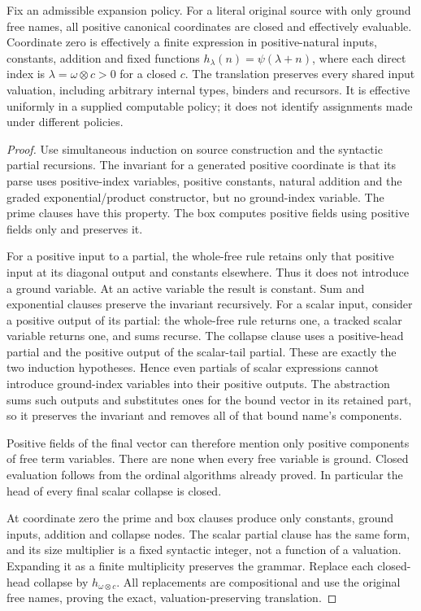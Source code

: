 \begin{theorem}\label{thm:forward-translation}
Fix an admissible expansion policy. For a literal original source with only ground free names, all positive
canonical coordinates are closed and effectively evaluable.  Coordinate
zero is effectively a finite expression in positive-natural inputs, constants,
addition and fixed functions $h_\lambda(n)=\psi(\lambda+n)$, where each
direct index is $\lambda=\omega\otimes c>0$ for a closed $c$.
The translation preserves every shared input valuation, including arbitrary
internal types, binders and recursors. It is effective uniformly in a
supplied computable policy; it does not identify assignments made under
different policies.
\end{theorem}
\begin{proof}
Use simultaneous induction on source construction and the syntactic partial
recursions.  The invariant for a generated positive coordinate is that its
parse uses positive-index variables, positive constants, natural addition
and the graded exponential/product constructor, but no ground-index variable.
The prime clauses have this property.  The box computes positive fields
using positive fields only and preserves it.

For a positive input to a partial, the whole-free rule retains only that
positive input at its diagonal output and constants elsewhere.  Thus it
does not introduce a ground variable.  At an active variable the result is
constant.  Sum and exponential clauses preserve the invariant recursively.
For a scalar input, consider a positive output of its partial: the whole-free
rule returns one, a tracked scalar variable returns one, and sums recurse.
The collapse clause uses a positive-head partial and the positive output of
the scalar-tail partial.  These are exactly the two induction hypotheses.
Hence even partials of scalar expressions cannot introduce ground-index
variables into their positive outputs.  The abstraction sums such outputs
and substitutes ones for the bound vector in its retained part, so it
preserves the invariant and removes all of that bound name's components.

Positive fields of the final vector can therefore mention only positive
components of free term variables.  There are none when every free variable
is ground.  Closed evaluation follows from the ordinal algorithms already
proved.  In particular the head of every final scalar collapse is closed.

At coordinate zero the prime and box clauses produce only constants,
ground inputs, addition and collapse nodes.  The scalar partial clause has
the same form, and its size multiplier is a fixed syntactic integer, not a
function of a valuation.  Expanding it as a finite multiplicity preserves
the grammar.  Replace each closed-head collapse by $h_{\omega\otimes c}$.
All replacements are compositional and use the original free names, proving
the exact, valuation-preserving translation.


\end{proof}

